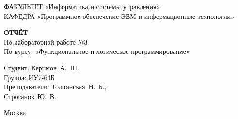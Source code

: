 \begin{titlepage}
{	{\doublespacing \small \raggedright ФАКУЛЬТЕТ \hspace{25mm} «Информатика и системы управления»\\
	КАФЕДРА \hspace{5mm} «Программное обеспечение ЭВМ и информационные технологии»\\}

	\vspace{30mm}

	\textbf{ОТЧЁТ}\\
	По лабораторной работе №3\\
	По курсу: «Функциональное и логическое программирование»\\

	\vspace{60mm}

	\hspace{70mm} Студент:       \hfill Керимов~А.~Ш.\\
	\hspace{70mm} Группа:        \hfill ИУ7-64Б\\
	\hspace{70mm} Преподаватели: \hfill Толпинская~Н.~Б.,\\
	                             \hfill Строганов~Ю.~В.\\

	\vfill

	Москва\\
	\the\year\\}
\end{titlepage}
